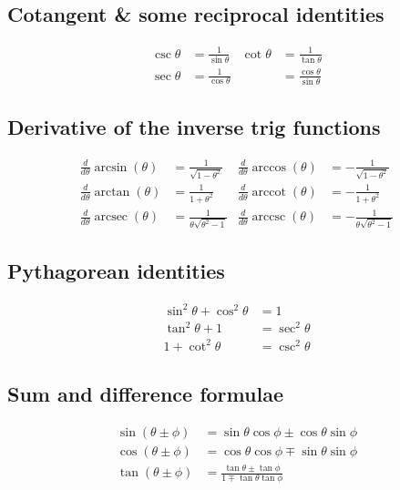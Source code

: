 \documentclass[10pt]{extarticle}
\DeclareMathOperator{\arccot}{arccot}
\DeclareMathOperator{\arcsec}{arcsec}
\DeclareMathOperator{\arccsc}{arccsc}
\theoremstyle{definition}
\begin{document}
	\begin{multicols}{2}
		\subsection*{Cotangent \& some reciprocal identities}
		\begin{align*}
			\csc\theta &= \frac{1}{\sin\theta} & \cot\theta &= \frac{1}{\tan\theta} \\
			\sec\theta &= \frac{1}{\cos\theta} & &= \frac{\cos\theta}{\sin\theta}
		\end{align*}

		\subsection*{Derivative of the inverse trig functions}
		\begin{align*}
			\frac{d}{d\theta} \arcsin{(\theta)} &= \frac{1}{\sqrt{1 - \theta^2}} & \frac{d}{d\theta} \arccos{(\theta)} &= -\frac{1}{\sqrt{1 - \theta^2}} \\
			\frac{d}{d\theta} \arctan{(\theta)} &= \frac{1}{1 + \theta^2} & \frac{d}{d\theta} \arccot{(\theta)} &= -\frac{1}{1 + \theta^2} \\
			\frac{d}{d\theta} \arcsec{(\theta)} &= \frac{1}{\theta \sqrt{\theta^2 - 1}} & \frac{d}{d\theta} \arccsc{(\theta)} &= -\frac{1}{\theta \sqrt{\theta^2 - 1}}
		\end{align*}

		\subsection*{Pythagorean identities}
		\begin{align*}
		\sin^2{\theta} + \cos^2{\theta} &= 1 \\
		\tan^2{\theta} + 1 &= \sec^2{\theta} \\
		1 + \cot^2{\theta} &= \csc^2{\theta}
		\end{align*}

		\subsection*{Sum and difference formulae}
		\begin{align*}
			\sin{(\theta \pm \phi)} &= \sin{\theta}\cos{\phi} \pm \cos{\theta}\sin{\phi} \\
			\cos{(\theta \pm \phi)} &= \cos{\theta}\cos{\phi} \mp \sin{\theta}\sin{\phi} \\
			\tan{(\theta \pm \phi)} &= \frac{\tan{\theta} \pm \tan{\phi}}{1 \mp \tan{\theta}\tan{\phi}}
		\end{align*}


\end{multicols}
\end{document}
